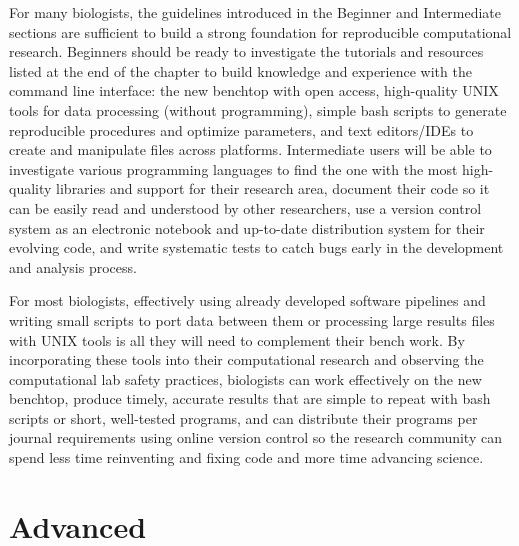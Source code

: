 \documentclass[ChapterTOCs,krantz2]{krantz} %
\begin{document}
For many biologists, the guidelines introduced in the Beginner and Intermediate
sections are sufficient to build a strong foundation for reproducible
computational research.  Beginners should be ready to investigate the tutorials
and resources listed at the end of the chapter to build knowledge and
experience with the command line interface: the new benchtop with open access,
high-quality UNIX tools for data processing (without programming), simple bash
scripts to generate reproducible procedures and optimize parameters, and text
editors/IDEs to create and manipulate files across platforms.  Intermediate
users
will be able to investigate various programming languages to find the one with
the most high-quality libraries and support for their research area, document
their code so it can be easily read and understood by other researchers, use a
version control system as an electronic notebook and up-to-date distribution
system for their evolving code, and write systematic tests to catch bugs early
in the development and analysis process. 

For most biologists, effectively using already developed software pipelines and writing
small scripts to port data between them or processing large results files with
UNIX tools is all they will need to complement their bench work.  By
incorporating these tools into their computational research and observing the
computational lab safety practices, biologists can work
effectively on the new benchtop, produce timely, accurate results that are
simple to repeat with bash scripts or short, well-tested programs, and can
distribute their programs per journal requirements using online version control
so the research community can spend less time reinventing and fixing code and
more time advancing science. 

\section{Advanced}
\end{document}
